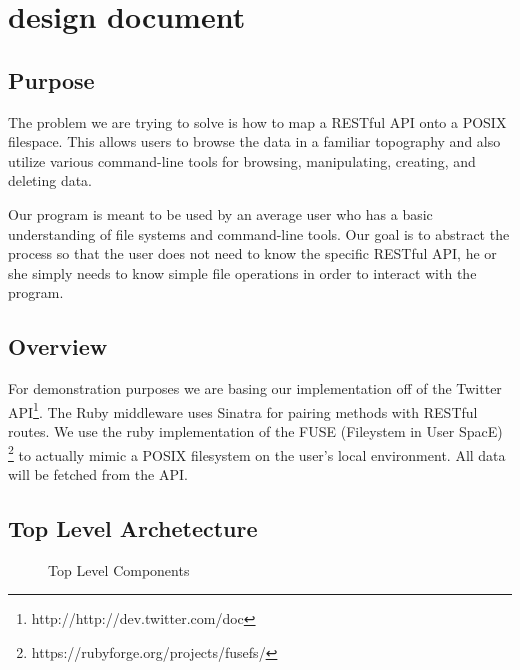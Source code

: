 \section{design document}

\subsection{Purpose}

The problem we are trying to solve is how to map a RESTful API onto a POSIX
filespace. This allows users to browse the data in a familiar topography and
also utilize various command-line tools for browsing, manipulating, creating,
and deleting data. 

Our program is meant to be used by an average user who has a basic understanding
of file systems and command-line tools. Our goal is to abstract the process so
that the user does not need to know the specific RESTful API, he or she simply
needs to know simple file operations in order to interact with the program.

\subsection{Overview}

For demonstration purposes we are basing our implementation off of the Twitter
API\footnote{http://http://dev.twitter.com/doc}. The Ruby middleware uses Sinatra
for pairing methods with RESTful routes. We use the ruby implementation of the
FUSE (Fileystem in User SpacE) \footnote{https://rubyforge.org/projects/fusefs/}
to actually mimic a POSIX filesystem on the user's local environment. All data
will be fetched from the API.

\subsection{Top Level Archetecture}

\begin{figure}[h]
\centering
{}
\caption{Top Level Components}\label{fig:top-top}
\end{figure}

